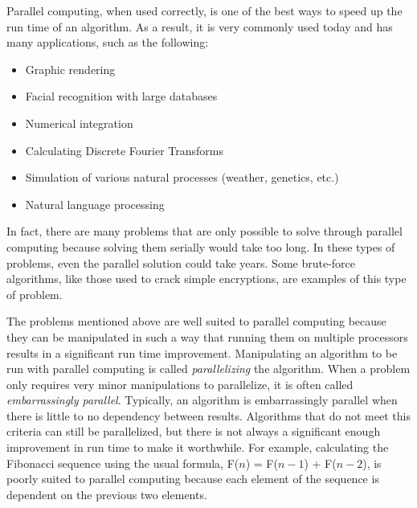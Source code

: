 Parallel computing, when used correctly, is one of the best ways to speed up the run time of an algorithm.
As a result, it is very commonly used today and has many applications, such as the following:
\begin{itemize}
\item Graphic rendering
\item Facial recognition with large databases
\item Numerical integration
\item Calculating Discrete Fourier Transforms
\item Simulation of various natural processes (weather, genetics, etc.)
\item Natural language processing
\end{itemize}
In fact, there are many problems that are only possible to solve through parallel computing because solving them serially would take too long.
In these types of problems, even the parallel solution could take years.
Some brute-force algorithms, like those used to crack simple encryptions, are examples of this type of problem.

The problems mentioned above are well suited to parallel computing because they can be manipulated in such a way that running them on multiple processors results in a significant run time improvement.
Manipulating an algorithm to be run with parallel computing is called \emph{parallelizing} the algorithm.
When a problem only requires very minor manipulations to parallelize, it is often called \emph{embarrassingly parallel}.
Typically, an algorithm is embarrassingly parallel when there is little to no dependency between results.
Algorithms that do not meet this criteria can still be parallelized, but there is not always a significant enough improvement in run time to make it worthwhile.
For example, calculating the Fibonacci sequence using the usual formula, F($n$) = F($n-1$) + F($n-2$), is poorly suited to parallel computing because each element of the sequence is dependent on the previous two elements.


